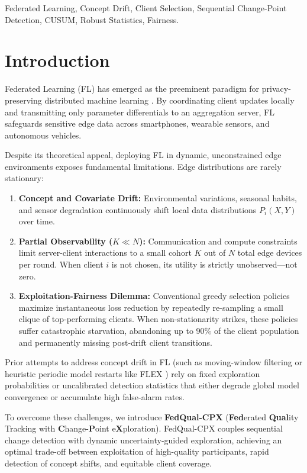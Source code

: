 \documentclass[journal,compsoc]{IEEEtran}
\begin{document}
\begin{IEEEkeywords}
Federated Learning, Concept Drift, Client Selection, Sequential Change-Point Detection, CUSUM, Robust Statistics, Fairness.
\end{IEEEkeywords}

\section{Introduction}
Federated Learning (FL) has emerged as the preeminent paradigm for privacy-preserving distributed machine learning \cite{mcmahan2017communication, kairouz2021advances}. By coordinating client updates locally and transmitting only parameter differentials to an aggregation server, FL safeguards sensitive edge data across smartphones, wearable sensors, and autonomous vehicles.

Despite its theoretical appeal, deploying FL in dynamic, unconstrained edge environments exposes fundamental limitations. Edge distributions are rarely stationary:
\begin{enumerate}
    \item \textbf{Concept and Covariate Drift:} Environmental variations, seasonal habits, and sensor degradation continuously shift local data distributions $P_i(X, Y)$ over time.
    \item \textbf{Partial Observability ($K \ll N$):} Communication and compute constraints limit server-client interactions to a small cohort $K$ out of $N$ total edge devices per round. When client $i$ is not chosen, its utility is strictly unobserved---not zero.
    \item \textbf{Exploitation-Fairness Dilemma:} Conventional greedy selection policies \cite{lai2021oort} maximize instantaneous loss reduction by repeatedly re-sampling a small clique of top-performing clients. When non-stationarity strikes, these policies suffer catastrophic starvation, abandoning up to 90\% of the client population and permanently missing post-drift client transitions.
\end{enumerate}

Prior attempts to address concept drift in FL (such as moving-window filtering or heuristic periodic model restarts like FLEX \cite{flex2026concept}) rely on fixed exploration probabilities or uncalibrated detection statistics that either degrade global model convergence or accumulate high false-alarm rates.

To overcome these challenges, we introduce \textbf{FedQual-CPX} (\textbf{Fed}erated \textbf{Qual}ity Tracking with \textbf{C}hange-\textbf{P}oint e\textbf{X}ploration). FedQual-CPX couples sequential change detection with dynamic uncertainty-guided exploration, achieving an optimal trade-off between exploitation of high-quality participants, rapid detection of concept shifts, and equitable client coverage.
\end{document}
